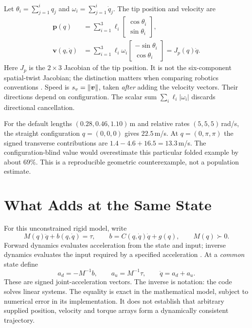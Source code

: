 Let $\theta_i=\sum_{j=1}^{i}q_j$ and
$\omega_i=\sum_{j=1}^{i}\dot q_j$. The tip position and velocity are
\begin{align}
 \bm p(q)&=\sum_{i=1}^{3}\ell_i
   \begin{bmatrix}\cos\theta_i\\\sin\theta_i\end{bmatrix},\\
 \bm v(q,\dot q)&=\sum_{i=1}^{3}\ell_i\omega_i
   \begin{bmatrix}-\sin\theta_i\\\cos\theta_i\end{bmatrix}
   =J_p(q)\dot q.
\end{align}
Here $J_p$ is the $2\times3$ Jacobian of the tip position. It is not the
six-component spatial-twist Jacobian; the distinction matters when comparing
robotics conventions \cite{LynchParkJacobianReview}.
Speed is $s_v=\left\lVert \bm v \right\rVert$, taken \emph{after} adding the velocity vectors.
Their directions depend on configuration. The scalar sum $\sum_i\ell_i|\omega_i|$ discards directional cancellation.

For the default lengths $(0.28,0.46,1.10)$\,m and relative rates
$(5,5,5)$\,rad/s, the straight configuration $q=(0,0,0)$ gives
$22.5$\,m/s. At $q=(0,\pi,\pi)$ the signed transverse contributions are
$1.4-4.6+16.5=13.3$\,m/s. The configuration-blind value would overestimate
this particular folded example by about $69\%$. This is a reproducible
geometric counterexample, not a population estimate.

\section{What Adds at the Same State}

For this unconstrained rigid model, write
\begin{equation}
 M(q)\ddot q+b(q,\dot q)=\tau,\qquad
 b=C(q,\dot q)\dot q+g(q),\qquad M(q)\succ0.
\end{equation}
Forward dynamics evaluates acceleration from the state and input; inverse
dynamics evaluates the input required by a specified acceleration
\cite{LynchParkDynamicsReview}. At a \emph{common} state define
\begin{equation}
 a_d=-M^{-1}b,\qquad a_u=M^{-1}\tau,\qquad \ddot q=a_d+a_u.
 \label{eq:capstone-joint-split}
\end{equation}
These are signed joint-acceleration vectors. The inverse is notation: the code
solves linear systems. The equality is exact in the mathematical model, subject
to numerical error in its implementation. It does not establish that arbitrary
supplied position, velocity and torque arrays form a dynamically consistent
trajectory.

